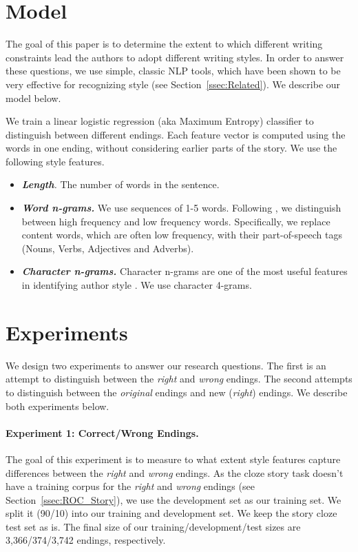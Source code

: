 \documentclass[11pt,a4paper]{article}
\newcommand{\secref}[1]{Section~\ref{ssec:#1}}
\newcommand{\isectionb}[1]{\section{#1}\label{ssec:#1}}
\begin{document}
\isectionb{Model}

The goal of this paper is to determine the extent to which 
different writing constraints lead the authors to adopt different writing styles. 
In order to answer these questions, we use simple, classic NLP tools, which have been shown to be very effective for recognizing style (see \secref{Related}).
We describe our model below.

We train a linear logistic regression (aka Maximum Entropy) classifier to distinguish between different endings. 
Each feature vector is computed using the words in one ending, without considering earlier parts of the story. 
We use the following style features.

\begin{itemize}
\item\textit{\textbf{Length}.} The number of words in the sentence.
\item\textit{\textbf{Word n-grams.}} We use sequences of 1-5 words. Following \cite{Tsur:2010,Schwartz:2013}, we distinguish between high frequency and low frequency words. 
Specifically, we replace content words, which are often low frequency, with their part-of-speech tags (Nouns, Verbs, Adjectives and Adverbs).
\item\textit{\textbf{Character n-grams.}} Character n-grams are one of the most useful features in identifying author style \cite{Stamatatos:2009}. 
We use character 4-grams.
\end{itemize}

\isectionb{Experiments}
We design two experiments to answer our research questions. 
The first is an attempt to distinguish between the {\it right} and {\it wrong} endings.
The second attempts to distinguish between the {\it original} endings and new ({\it right}) endings.
We describe both experiments below.

\paragraph{Experiment 1: Correct/Wrong Endings.}
The goal of this experiment is to measure to what extent  style features capture differences between the {\it right} and {\it wrong} endings.
As the cloze story task doesn't have a training corpus for the {\it right} and {\it wrong} endings (see \secref{ROC_Story}), we use the development set as our training set. 
We split it (90/10) into our training and development set. We keep the story cloze test set as is.
The final size of our training/development/test sizes are 3,366/374/3,742 endings, respectively. 
\end{document}
